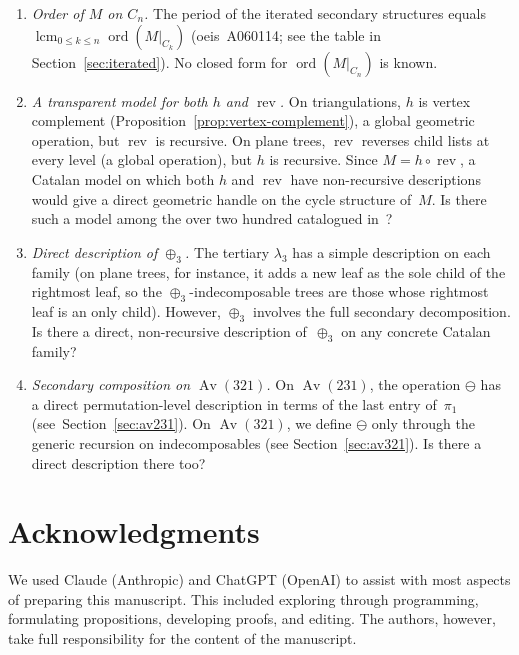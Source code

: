 \documentclass[a4paper,11pt]{article}
\theoremstyle{definition}
\DeclareMathOperator{\Av}{Av}
\DeclareMathOperator{\rev}{rev}
\newcommand\oeis{{\sc oeis}}
\begin{document}
\begin{enumerate}
\item \emph{Order of $M$ on $C_n$.}  The period of the iterated
  secondary structures equals
  $\operatorname{lcm}_{0 \leq k \leq n}
  \operatorname{ord}(M|_{C_k})$
  (\oeis\ A060114; see the table in
  Section~\ref{sec:iterated}).
  No closed form for
  $\operatorname{ord}(M|_{C_n})$ is known.

\item \emph{A transparent model for both $h$ and
  $\rev$.}
  On triangulations, $h$ is vertex complement
  (Proposition~\ref{prop:vertex-complement}), a global
  geometric operation, but $\rev$ is recursive. On plane
  trees, $\rev$ reverses child lists at every level (a
  global operation), but $h$ is recursive. Since
  $M = h \circ \rev$, a Catalan model on which both $h$
  and $\rev$ have non-recursive descriptions
  would give a direct geometric handle on the cycle
  structure of~$M$. Is there such a model among the
  over two hundred catalogued in~\cite{Stanley15}?

\item \emph{Direct description of $\oplus_3$.}
  The tertiary $\lambda_3$ has a simple description
  on each family (on plane trees, for instance, it adds a
  new leaf as the sole child of the rightmost leaf, so the
  $\oplus_3$-indecomposable trees are those
  whose rightmost leaf is an only child). However,
  $\oplus_3$ involves the full secondary decomposition.
  Is there a direct, non-recursive description
  of~$\oplus_3$ on any concrete Catalan family?

\item \emph{Secondary composition on $\Av(321)$.}
  On $\Av(231)$, the operation $\ominus$ has a direct
  permutation-level description in terms of the last
  entry of~$\pi_1$ (see~Section~\ref{sec:av231}). On
  $\Av(321)$, we define $\ominus$ only through the
  generic recursion on indecomposables
  (see Section~\ref{sec:av321}). Is there a direct description
  there too?
\end{enumerate}

\section{Acknowledgments}
We used Claude (Anthropic) and ChatGPT (OpenAI) to assist with most
aspects of preparing this manuscript. This included exploring through
programming, formulating propositions, developing proofs, and
editing. The authors, however, take full responsibility for the content
of the manuscript.
\end{document}
